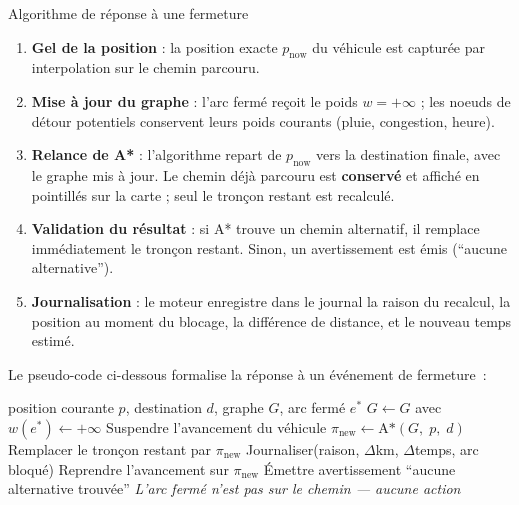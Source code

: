 \documentclass[12pt,a4paper]{article}
\begin{document}
\begin{methbox}{Algorithme de r\'eponse \`a une fermeture}
\begin{enumerate}[leftmargin=1.5em, itemsep=3pt]
  \item \textbf{Gel de la position} : la position exacte $p_{\text{now}}$ du
        v\'ehicule est captur\'ee par interpolation sur le chemin parcouru.
  \item \textbf{Mise \`a jour du graphe} : l'arc ferm\'e re\c{c}oit le poids
        $w = +\infty$ ; les noeuds de d\'etour potentiels conservent leurs
        poids courants (pluie, congestion, heure).
  \item \textbf{Relance de A*} : l'algorithme repart de $p_{\text{now}}$
        vers la destination finale, avec le graphe mis \`a jour.
        Le chemin d\'ej\`a parcouru est \textbf{conserv\'e} et affich\'e
        en pointill\'es sur la carte ; seul le tron\c{c}on restant est recalcul\'e.
  \item \textbf{Validation du r\'esultat} : si A* trouve un chemin alternatif,
        il remplace imm\'ediatement le tron\c{c}on restant.
        Sinon, un avertissement est \'emis (``aucune alternative'').
  \item \textbf{Journalisation} : le moteur enregistre dans le journal la raison
        du recalcul, la position au moment du blocage, la diff\'erence de distance,
        et le nouveau temps estim\'e.
\end{enumerate}
\end{methbox}

\bigskip

\noindent
Le pseudo-code ci-dessous formalise la r\'eponse \`a un \'ev\'enement de fermeture~:

\begin{algorithm}[H]
\caption{R\'eponse \`a une fermeture d'arc en cours d'intervention}
\begin{algorithmic}[1]
\Require position courante $p$, destination $d$, graphe $G$, arc ferm\'e $e^*$
\State $G \leftarrow G$ avec $w(e^*) \leftarrow +\infty$
    \State Suspendre l'avancement du v\'ehicule
    \State $\pi_{\text{new}} \leftarrow \text{A*}(G,\; p,\; d)$
        \State Remplacer le tron\c{c}on restant par $\pi_{\text{new}}$
        \State Journaliser(raison, $\Delta$km, $\Delta$temps, arc bloqu\'e)
        \State Reprendre l'avancement sur $\pi_{\text{new}}$
    \Else
        \State \'Emettre avertissement ``aucune alternative trouv\'ee''
    \EndIf
\Else
    \State \textit{L'arc ferm\'e n'est pas sur le chemin --- aucune action}
\EndIf
\end{algorithmic}
\end{algorithm}
\end{document}
